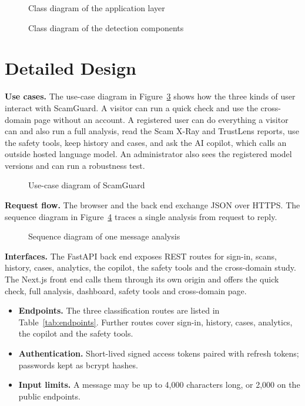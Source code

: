 \begin{figure}[H]
\centering
\resizebox{\linewidth}{!}{}
\caption{Class diagram of the application layer}
\label{fig:class1}
\end{figure}

\begin{figure}[H]
\centering
\resizebox{0.95\linewidth}{!}{}
\caption{Class diagram of the detection components}
\label{fig:class2}
\end{figure}

\section{Detailed Design}
\textbf{Use cases.} The use-case diagram in Figure~\ref{fig:usecase} shows how the three kinds of user interact with ScamGuard. A visitor can run a quick check and use the cross-domain page without an account. A registered user can do everything a visitor can and also run a full analysis, read the Scam X-Ray and TrustLens reports, use the safety tools, keep history and cases, and ask the AI copilot, which calls an outside hosted language model. An administrator also sees the registered model versions and can run a robustness test.

\begin{figure}[H]
\centering
\resizebox{0.85\linewidth}{!}{}
\caption{Use-case diagram of ScamGuard}
\label{fig:usecase}
\end{figure}

\textbf{Request flow.} The browser and the back end exchange JSON over HTTPS. The sequence diagram in Figure~\ref{fig:seq} traces a single analysis from request to reply.

\begin{figure}[H]
\centering
\resizebox{0.95\linewidth}{!}{}
\caption{Sequence diagram of one message analysis}
\label{fig:seq}
\end{figure}

\textbf{Interfaces.} The FastAPI back end exposes REST routes for sign-in, scans, history, cases, analytics, the copilot, the safety tools and the cross-domain study. The Next.js front end calls them through its own origin and offers the quick check, full analysis, dashboard, safety tools and cross-domain page.
\begin{itemize}
\item \textbf{Endpoints.} The three classification routes are listed in Table~\ref{tab:endpoints}. Further routes cover sign-in, history, cases, analytics, the copilot and the safety tools.
\item \textbf{Authentication.} Short-lived signed access tokens paired with refresh tokens; passwords kept as bcrypt hashes.
\item \textbf{Input limits.} A message may be up to 4,000 characters long, or 2,000 on the public endpoints.
\end{itemize}

